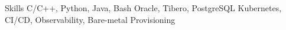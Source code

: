 
\begin{rubric}{Skills}
	C/C++, Python, Java, Bash
\entry*[Databases]
	Oracle, Tibero, PostgreSQL
\entry*[DevOps]
	Kubernetes, CI/CD, Observability, Bare-metal Provisioning
\end{rubric}
